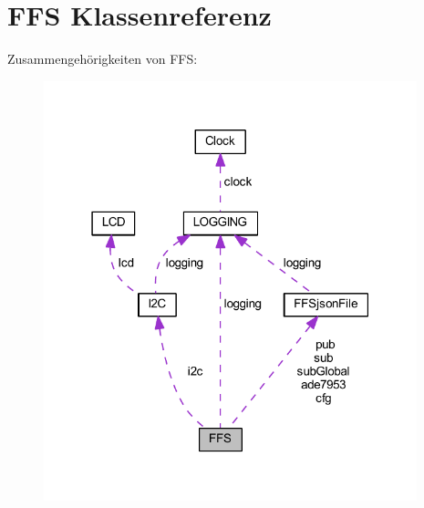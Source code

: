 \hypertarget{class_f_f_s}{}\section{F\+FS Klassenreferenz}
\label{class_f_f_s}


Zusammengehörigkeiten von F\+FS\+:
\nopagebreak
\begin{figure}[H]
\begin{center}
\leavevmode
\includegraphics[width=307pt]{class_f_f_s__coll__graph}
\end{center}
\end{figure}
